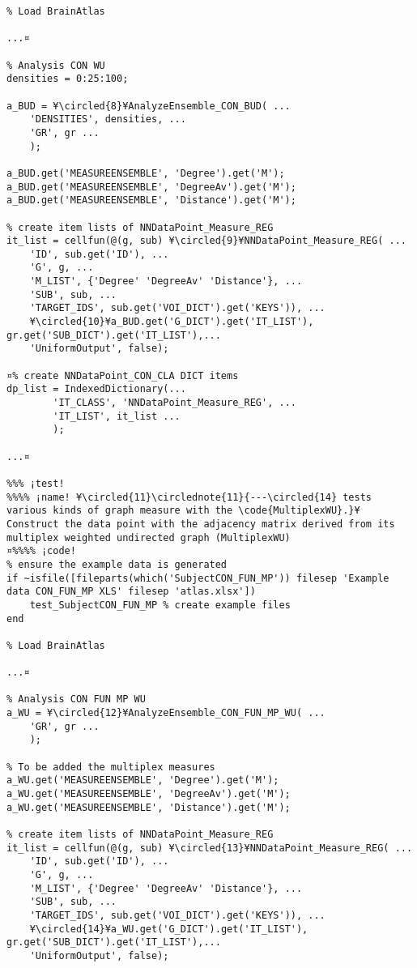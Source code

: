 \documentclass{tufte-handout}
\begin{document}
\begin{lstlisting}
% Load BrainAtlas

...¤

% Analysis CON WU
densities = 0:25:100;

a_BUD = ¥\circled{8}¥AnalyzeEnsemble_CON_BUD( ...
    'DENSITIES', densities, ...
    'GR', gr ...
    );

a_BUD.get('MEASUREENSEMBLE', 'Degree').get('M');
a_BUD.get('MEASUREENSEMBLE', 'DegreeAv').get('M');
a_BUD.get('MEASUREENSEMBLE', 'Distance').get('M');

% create item lists of NNDataPoint_Measure_REG
it_list = cellfun(@(g, sub) ¥\circled{9}¥NNDataPoint_Measure_REG( ...
    'ID', sub.get('ID'), ...
    'G', g, ...
    'M_LIST', {'Degree' 'DegreeAv' 'Distance'}, ...
    'SUB', sub, ...
    'TARGET_IDS', sub.get('VOI_DICT').get('KEYS')), ...
    ¥\circled{10}¥a_BUD.get('G_DICT').get('IT_LIST'), gr.get('SUB_DICT').get('IT_LIST'),...
    'UniformOutput', false);

¤% create NNDataPoint_CON_CLA DICT items
dp_list = IndexedDictionary(...
        'IT_CLASS', 'NNDataPoint_Measure_REG', ...
        'IT_LIST', it_list ...
        );

...¤

%%% ¡test!
%%%% ¡name! ¥\circled{11}\circlednote{11}{---\circled{14} tests various kinds of graph measure with the \code{MultiplexWU}.}¥
Construct the data point with the adjacency matrix derived from its multiplex weighted undirected graph (MultiplexWU) 
¤%%%% ¡code!
% ensure the example data is generated
if ~isfile([fileparts(which('SubjectCON_FUN_MP')) filesep 'Example data CON_FUN_MP XLS' filesep 'atlas.xlsx'])
    test_SubjectCON_FUN_MP % create example files
end

% Load BrainAtlas

...¤

% Analysis CON FUN MP WU
a_WU = ¥\circled{12}¥AnalyzeEnsemble_CON_FUN_MP_WU( ...
    'GR', gr ...
    );

% To be added the multiplex measures
a_WU.get('MEASUREENSEMBLE', 'Degree').get('M');
a_WU.get('MEASUREENSEMBLE', 'DegreeAv').get('M');
a_WU.get('MEASUREENSEMBLE', 'Distance').get('M');

% create item lists of NNDataPoint_Measure_REG
it_list = cellfun(@(g, sub) ¥\circled{13}¥NNDataPoint_Measure_REG( ...
    'ID', sub.get('ID'), ...
    'G', g, ...
    'M_LIST', {'Degree' 'DegreeAv' 'Distance'}, ...
    'SUB', sub, ...
    'TARGET_IDS', sub.get('VOI_DICT').get('KEYS')), ...
    ¥\circled{14}¥a_WU.get('G_DICT').get('IT_LIST'), gr.get('SUB_DICT').get('IT_LIST'),...
    'UniformOutput', false);


\end{lstlisting}
\end{document}
